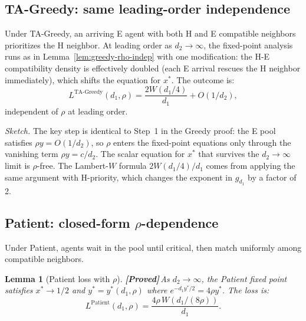 \documentclass{article}
\theoremstyle{plain}
\newtheorem{lemma}{Lemma}
\theoremstyle{definition}
\newcommand{\proved}{\textcolor{provedgreen}{\textbf{[Proved]}}\,}
\begin{document}
\subsection{TA-Greedy: same leading-order independence}
\label{sec:TAG-rho}

Under TA-Greedy, an arriving E agent with both H and E compatible neighbors
prioritizes the H neighbor.  At leading order as $d_2\to\infty$, the
fixed-point analysis runs as in Lemma~\ref{lem:greedy-rho-indep} with one
modification: the H-E compatibility density is effectively doubled (each E
arrival rescues the H neighbor immediately), which shifts the equation for
$x^*$.  The outcome is:
\[
  L^{\text{TA-Greedy}}(d_1,\rho)
    = \frac{2W(d_1/4)}{d_1}+O(1/d_2),
\]
independent of $\rho$ at leading order.

\emph{Sketch.}  The key step is identical to Step~1 in the Greedy proof: the
E pool satisfies $\rho y=O(1/d_2)$, so $\rho$ enters the fixed-point
equations only through the vanishing term $\rho y=c/d_2$.  The scalar
equation for $x^*$ that survives the $d_2\to\infty$ limit is $\rho$-free.
The Lambert-$W$ formula $2W(d_1/4)/d_1$ comes from applying the same
argument with H-priority, which changes the exponent in $g_{d_1}$ by a
factor of 2.

\subsection{Patient: closed-form $\rho$-dependence}
\label{sec:patient-rho}

Under Patient, agents wait in the pool until critical, then match uniformly
among compatible neighbors.

\begin{lemma}[Patient loss with $\rho$]
\label{lem:patient-rho}
\proved As $d_2\to\infty$, the Patient fixed point satisfies $x^*\to 1/2$
and $y^*=y^*(d_1,\rho)$ where $e^{-d_1 y^*/2}=4\rho y^*$.  The loss is:
\[
  \boxed{L^{\mathrm{Patient}}(d_1,\rho)
    = \frac{4\rho\,W(d_1/(8\rho))}{d_1}.}
\]
\end{lemma}
\end{document}
